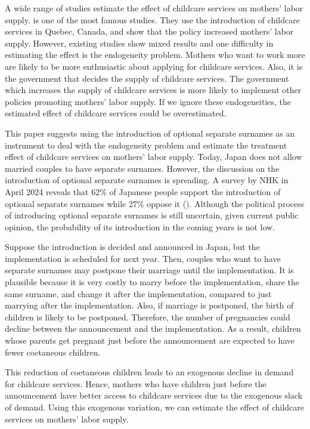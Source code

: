 \documentclass[12pt]{article}
\begin{document}
A wide range of studies estimate the effect of childcare services on mothers' labor supply.
\cite{Baker2008-vt} is one of the most famous studies. 
They use the introduction of childcare services in Quebec, Canada, and show that the policy increased mothers' labor supply.
However, existing studies show mixed results and one difficulty in estimating the effect is the endogeneity problem.
Mothers who want to work more are likely to be more enthusiastic about applying for childcare services.
Also, it is the government that decides the supply of childcare services. 
The government which increases the supply of childcare services is more likely to implement other policies promoting mothers' labor supply.
If we ignore these endogeneities, the estimated effect of childcare services could be overestimated.


This paper suggests using the introduction of optional separate surnames as an instrument to deal with the endogeneity problem and estimate the treatment effect of childcare services on mothers' labor supply.
Today, Japan does not allow married couples to have separate surnames.
However, the discussion on the introduction of optional separate surnames is spreading.
A survey by NHK in April 2024 reveals that 62\% of Japanese people support the introduction of optional separate surnames while 27\% oppose it (\cite{nhk}).
Although the political process of introducing optional separate surnames is still uncertain, given current public opinion, the probability of its introduction in the coming years is not low.


Suppose the introduction is decided and announced in Japan, but the implementation is scheduled for next year.
Then, couples who want to have separate surnames may postpone their marriage until the implementation. 
It is plausible because it is very costly to marry before the implementation, share the same surname, and change it after the implementation, compared to just marrying after the implementation.
Also, if marriage is postponed, the birth of children is likely to be postponed.
Therefore, the number of pregnancies could decline between the announcement and the implementation.
As a result, children whose parents get pregnant just before the announcement are expected to have fewer coetaneous children.


This reduction of coetaneous children leads to an exogenous decline in demand for childcare services.
Hence, mothers who have children just before the announcement have better access to childcare services due to the exogenous slack of demand.
Using this exogenous variation, we can estimate the effect of childcare services on mothers' labor supply. 
\end{document}

